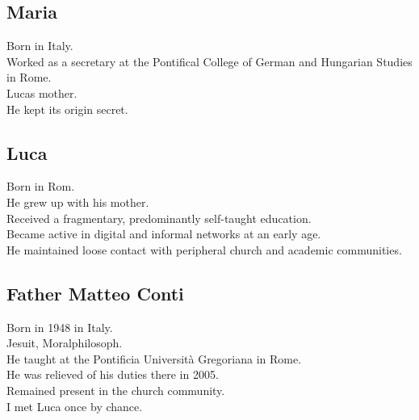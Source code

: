 \documentclass[
]{article}
\begin{document}
\subsection{Maria}\label{maria}

Born in Italy.\\
Worked as a secretary at the Pontifical College of German and Hungarian Studies in Rome.\\
Luca\textquotesingle s mother.\\
He kept its origin secret.

\subsection{Luca}\label{luca}

Born in Rom.\\
He grew up with his mother.\\
Received a fragmentary, predominantly self-taught education.\\
Became active in digital and informal networks at an early age.\\
He maintained loose contact with peripheral church and academic communities.

\subsection{Father Matteo Conti}\label{father-matteo-conti}

Born in 1948 in Italy.\\
Jesuit, Moralphilosoph.\\
He taught at the Pontificia Università Gregoriana in Rome.\\
He was relieved of his duties there in 2005.\\
Remained present in the church community.\\
I met Luca once by chance.
\end{document}
